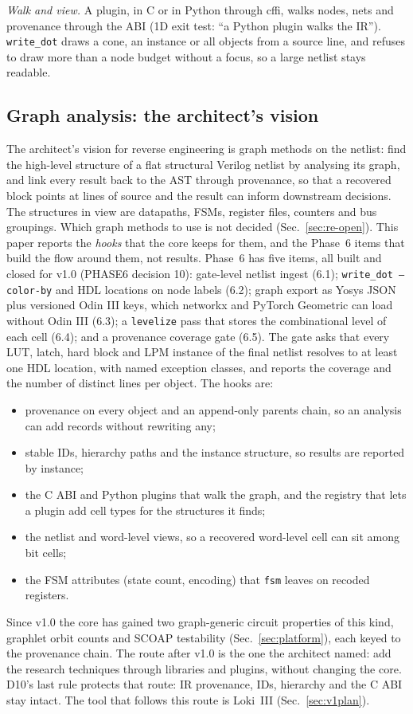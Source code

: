 \documentclass[conference]{IEEEtran}
\newcommand{\code}[1]{\texttt{#1}}
\begin{document}
\emph{Walk and view.} A plugin, in C or in Python through cffi, walks nodes, nets and
provenance through the ABI (1D exit test: ``a Python plugin walks the IR''). \code{write\_dot}
draws a cone, an instance or all objects from a source line, and refuses to draw more than a node
budget without a focus, so a large netlist stays readable.

\subsection{Graph analysis: the architect's vision}
\label{sec:re-graph}

The architect's vision for reverse engineering is graph methods on the netlist: find the
high-level structure of a flat structural Verilog netlist by analysing its graph, and link every
result back to the AST through provenance, so that a recovered block points at lines of source
and the result can inform downstream decisions. The structures in view are datapaths, FSMs,
register files, counters and bus groupings. Which graph methods to use is not decided
(Sec.~\ref{sec:re-open}). This paper reports the \emph{hooks} that the core keeps for them, and
the Phase~6 items that build the flow around them, not results. Phase~6 has five items, all
built and closed for v1.0 (PHASE6 decision 10): gate-level netlist ingest (6.1); \code{write\_dot --color-by} and
HDL locations on node labels (6.2); graph export as Yosys JSON plus versioned Odin III keys, which
networkx and PyTorch Geometric can load without Odin III (6.3); a \code{levelize} pass that stores
the combinational level of each cell (6.4); and a provenance coverage gate (6.5). The gate asks
that every LUT, latch, hard block and LPM instance of the final netlist resolves to at least one
HDL location, with named exception classes, and reports the coverage and the number of distinct
lines per object. The hooks are:
\begin{itemize}
\item provenance on every object and an append-only parents chain, so an analysis can add
  records without rewriting any;
\item stable IDs, hierarchy paths and the instance structure, so results are reported by
  instance;
\item the C ABI and Python plugins that walk the graph, and the registry that lets a plugin add
  cell types for the structures it finds;
\item the netlist and word-level views, so a recovered word-level cell can sit among bit cells;
\item the FSM attributes (state count, encoding) that \code{fsm} leaves on recoded registers.
\end{itemize}
Since v1.0 the core has gained two graph-generic circuit properties of this kind, graphlet orbit
counts and SCOAP testability (Sec.~\ref{sec:platform}), each keyed to the provenance chain.
The route after v1.0 is the one the architect named: add the research techniques through libraries
and plugins, without changing the core. D10's last rule protects that route: IR provenance, IDs,
hierarchy and the C ABI stay intact. The tool that follows this route is Loki~III
(Sec.~\ref{sec:v1plan}).
\end{document}
